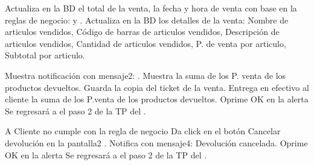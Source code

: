 \begin{UCtrayectoria}
	\UCpaso [\UCsist] Actualiza en la BD el total de la venta, la fecha y hora de venta con base en la reglas de negocio:  y .
	\UCpaso [\UCsist] Actualiza en la BD los detalles de la venta: Nombre de articulos vendidos, Código de barras de articulos vendidos, Descripción de articulos vendidos, Cantidad de articulos vendidos, P. de venta por articulo, Subtotal por articulo.

	\UCpaso [\UCsist] Muestra notificación con mensaje2: .
	\UCpaso [\UCsist] Muestra la suma de los P. venta de los productos devueltos.
	\UCpaso [\UCactor] Guarda la copia del ticket de la venta.
	\UCpaso [\UCactor] Entrega en efectivo al cliente la suma de los P.venta de los productos devueltos.
	\UCpaso [\UCactor] Oprime OK en la alerta 
	\UCpaso [\UCsist] Se regresará a el paso 2 de la TP del .

\end{UCtrayectoria}


\begin{UCtrayectoriaA}{A}{ Cliente no cumple con la regla de negocio   }
	\UCpaso [\UCactor] Da click en el botón Cancelar devolución en la pantalla2 . 
	\UCpaso [\UCsist] Notifica con mensaje4: {Devolución cancelada}.
	\UCpaso [\UCactor] Oprime OK en la alerta 
	\UCpaso [\UCsist] Se regresará a el paso 2 de la TP del .
\end{UCtrayectoriaA}


